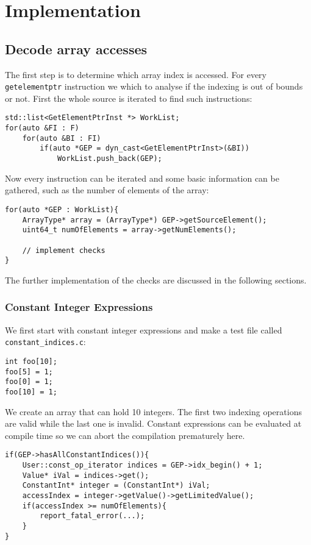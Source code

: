 \documentclass{report}
\begin{document}
\section{Implementation}
\subsection{Decode array accesses}
The first step is to determine which array index is accessed. For every \texttt{getelementptr} instruction we which to analyse if the indexing is out of bounds or not. First the whole source is iterated to find such instructions:
\begin{lstlisting}
std::list<GetElementPtrInst *> WorkList;
for(auto &FI : F)
	for(auto &BI : FI)
		if(auto *GEP = dyn_cast<GetElementPtrInst>(&BI))
			WorkList.push_back(GEP);
\end{lstlisting}

Now every instruction can be iterated and some basic information can be gathered, such as the number of elements of the array:
\begin{lstlisting}
for(auto *GEP : WorkList){
	ArrayType* array = (ArrayType*) GEP->getSourceElement();
	uint64_t numOfElements = array->getNumElements();
	
	// implement checks
}
\end{lstlisting}
The further implementation of the checks are discussed in the following sections.
\subsubsection{Constant Integer Expressions}
We first start with constant integer expressions and make a test file called \texttt{constant\_indices.c}:
\begin{lstlisting}
int foo[10];
foo[5] = 1;
foo[0] = 1;
foo[10] = 1;
\end{lstlisting}
We create an array that can hold 10 integers. The first two indexing operations are valid while the last one is invalid. Constant expressions can be evaluated at compile time so we can abort the compilation prematurely here. 

\begin{lstlisting}
if(GEP->hasAllConstantIndices()){
	User::const_op_iterator indices = GEP->idx_begin() + 1;
	Value* iVal = indices->get();
	ConstantInt* integer = (ConstantInt*) iVal;
	accessIndex = integer->getValue()->getLimitedValue();
	if(accessIndex >= numOfElements){
		report_fatal_error(...);
	}
}
\end{lstlisting}
\end{document}
